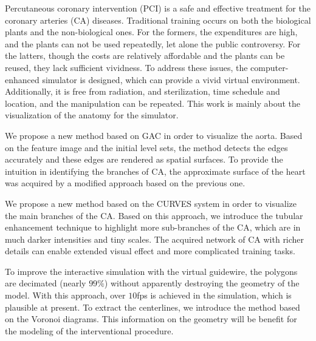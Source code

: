 
\begin{englishabstract}

Percutaneous coronary intervention (PCI) is a safe and effective treatment for the coronary arteries (CA) diseases.
Traditional training occurs on both the biological plants and the non-biological ones. 
For the formers, the expenditures are high, and the plants can not be used repeatedly, let alone the public controversy. 
For the latters, though the costs are relatively affordable and the plants can be reused, they lack sufficient vividness. 
To address these issues, the computer-enhanced simulator is designed, which can provide a vivid virtual environment.
Additionally, it is free from radiation, and sterilization, time schedule and location, and the manipulation can be repeated. 
This work is mainly about the visualization of the anatomy for the simulator.

We propose a new method based on GAC in order to visualize the aorta.
Based on the feature image and the initial level sets, the method detects the edges accurately and these edges are rendered as spatial surfaces. 
To provide the intuition in identifying the branches of CA, the approximate surface of the heart was acquired by a modified approach based on the previous one. 

We propose a new method based on the CURVES system in order to visualize the main branches of the CA. 
Based on this approach, we introduce the tubular enhancement technique to highlight more sub-branches of the CA, which are in much darker intensities and tiny scales.
The acquired network of CA with richer details can enable extended visual effect and more complicated training tasks.

To improve the interactive simulation with the virtual guidewire, the polygons are decimated (nearly $99 \%$) without apparently destroying the geometry of the model.
With this approach, over $10$fps is achieved in the simulation, which is plausible at present.
To extract the centerlines, we introduce the method based on the Voronoi diagrams. 
This information on the geometry will be benefit for the modeling of the interventional procedure.

%
\end{englishabstract}
